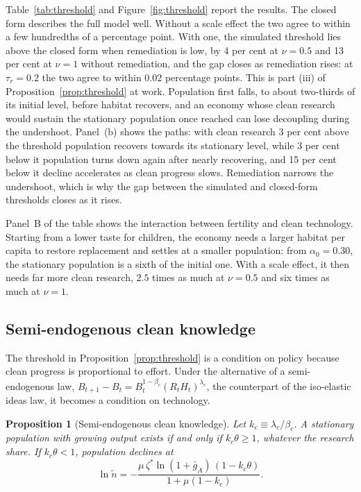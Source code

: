 \documentclass[11pt]{article}
\newtheorem{proposition}{Proposition}
\begin{document}
Table~\ref{tab:threshold} and Figure~\ref{fig:threshold} report the results. The closed form describes the
full model well. Without a scale effect the two agree to within a few hundredths of a percentage point.
With one, the simulated threshold lies above the closed form when remediation is low, by 4 per cent at
$\nu=0.5$ and 13 per cent at $\nu=1$ without remediation, and the gap closes as remediation rises: at
$\tau_r=0.2$ the two agree to within $0.02$ percentage points.
This is part (iii) of Proposition~\ref{prop:threshold} at work. Population first falls, to about
two-thirds of its initial level, before habitat recovers, and an economy whose clean research would
sustain the stationary population once reached can lose decoupling during the undershoot. Panel~(b)
shows the paths: with clean research 3 per cent above the threshold population recovers towards its
stationary level, while 3 per cent below it population turns down again after nearly recovering, and
15 per cent below it decline accelerates as clean progress slows. Remediation narrows the undershoot,
which is why the gap between the simulated and closed-form thresholds closes as it rises.

Panel~B of the table shows the interaction between fertility and clean technology. Starting from a lower
taste for children, the economy needs a larger habitat per capita to restore replacement and settles at a
smaller population: from $\alpha_0=0.30$, the stationary population is a sixth of the initial one. With a
scale effect, it then needs far more clean research, $2.5$ times as much at $\nu=0.5$ and six times as
much at $\nu=1$.

\subsection{Semi-endogenous clean knowledge}
\label{sub:semiendog}
The threshold in Proposition~\ref{prop:threshold} is a condition on policy because clean progress is
proportional to effort. Under the alternative of a semi-endogenous law,
$B_{t+1}-B_t=B_t^{1-\beta_c}(R_tH_t)^{\lambda_c}$, the counterpart of the iso-elastic ideas law, it becomes
a condition on technology.

\begin{proposition}[Semi-endogenous clean knowledge]
\label{prop:semiendog}
Let $k_c\equiv\lambda_c/\beta_c$. A stationary population with growing output exists if and only if
$k_c\theta\ge1$, whatever the research share. If $k_c\theta<1$, population declines at
\[
\ln\tilde n=-\frac{\mu\,\zeta^\ast\ln(1+\bar g_A)\,(1-k_c\theta)}{1+\mu(1-k_c)} .
\]
\end{proposition}
\end{document}
